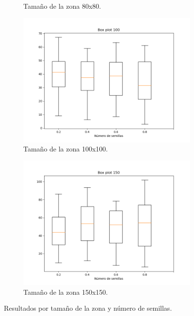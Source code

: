 \documentclass{article}
\begin{document}
\begin{figure}
\begin{subfigure}[b]{0.45\linewidth}
		\caption{Tamaño de la zona 80x80.}
		\label{80}
	\end{subfigure}
		\begin{subfigure}[b]{0.45\linewidth}
			\includegraphics[width=\linewidth]{Fig100.png}
			\caption{Tamaño de la zona 100x100.}
			\label{100}
	\end{subfigure}
		\begin{subfigure}[b]{0.45\linewidth}
				\includegraphics[width=\linewidth]{Fig150.png}
				\caption{Tamaño de la zona 150x150.}
				\label{150}
	\end{subfigure}
	\caption{Resultados por  tamaño de la zona y número de semillas.}  		
\end{figure}
\end{document}
